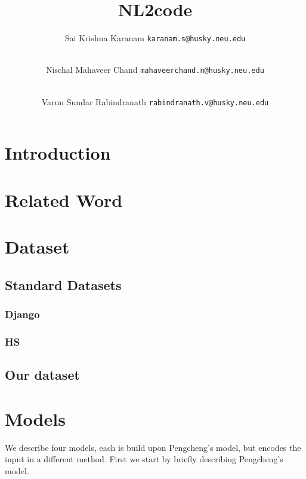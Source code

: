 \documentclass{IEEEtran}
\title{\textbf{NL2code}}
\author{
    Sai Krishna Karanam 
    \texttt{karanam.s@husky.neu.edu}
    \and \\
    Nischal Mahaveer Chand 
    \texttt{mahaveerchand.n@husky.neu.edu}
    \and \\
    Varun Sundar Rabindranath 
    \texttt{rabindranath.v@husky.neu.edu}
}
\date{}
\begin{document}
    \maketitle

    \section{Introduction}
    \blindtext

    \section{Related Word}
    \blindtext

    \section{Dataset}
      \subsection{Standard Datasets}
        \blindtext
        \subsubsection{Django}
        \blindtext
        \subsubsection{HS}
        \blindtext
      \subsection{Our dataset}
      \blindtext

    \section{Models}
    We describe four models, each is build upon Pengcheng's model, but encodes the input in a 
    different method. First we start by briefly describing Pengcheng's model.
\end{document}
